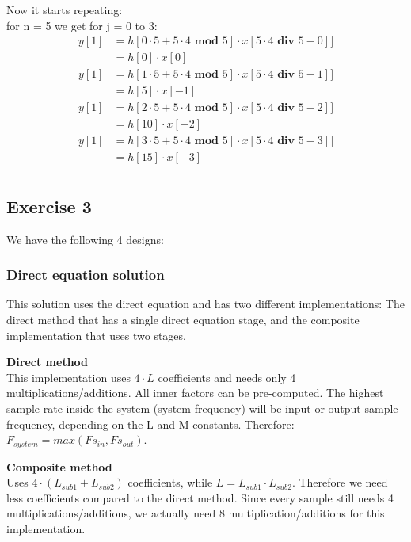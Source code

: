 \documentclass[a4paper,twoside,11pt, fleqn]{article}
\begin{document}
Now it starts repeating:\\

for n = 5 we get for j = 0 to 3:
\begin{align}
y[1] &= h[0\cdot 5 + 5\cdot 4 \textbf{ mod } 5]\cdot x[5\cdot 4 \textbf{ div } 5 - 0]]\\ 
&= h[0]\cdot x[0] \\
y[1] &= h[1\cdot 5 + 5\cdot 4 \textbf{ mod } 5]\cdot x[5\cdot 4 \textbf{ div } 5 - 1]] \\
&= h[5]\cdot x[-1] \\
y[1] &= h[2\cdot 5 + 5\cdot 4 \textbf{ mod } 5]\cdot x[5\cdot 4 \textbf{ div } 5 - 2]] \\
&= h[10]\cdot x[-2] \\
y[1] &= h[3\cdot 5 + 5\cdot 4 \textbf{ mod } 5]\cdot x[5\cdot 4 \textbf{ div } 5 - 3]] \\
&= h[15]\cdot x[-3] \\
\end{align}


\newpage
\subsection{Exercise 3}
We have the following 4 designs: 

\subsubsection{Direct equation solution}
This solution uses the direct equation and has two different implementations: The direct method that has a single direct equation stage, and the composite implementation that uses two stages.

\smallskip
\textbf{Direct method}\\
This implementation uses $4\cdot L$ coefficients and needs only 4 multiplications/additions. All inner factors can be pre-computed.
\smallskip
The highest sample rate inside the system (system frequency) will be input or output sample frequency, depending on the L and M constants. Therefore: $F_{system} = max(Fs_{in}, Fs_{out})$.
 
\smallskip 
\textbf{Composite method}\\
Uses $4\cdot (L_{sub1} + L_{sub2})$ coefficients, while $L = L_{sub1} \cdot L_{sub2}$. Therefore we need less coefficients compared to the direct method. Since every sample still needs 4 multiplications/additions, we actually need 8 multiplication/additions for this implementation.
\end{document}
